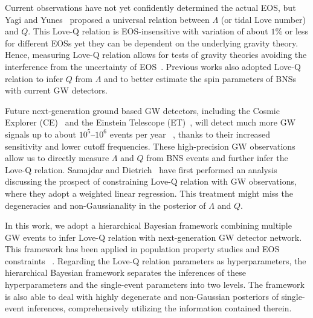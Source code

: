 \documentclass[a4paper,11pt]{article}
\begin{document}
Current observations have not yet confidently determined the actual EOS, but Yagi 
and Yunes~\cite{Yagi:2013bca,Yagi:2013awa} proposed a universal relation between 
$\Lambda$ (or tidal Love number) and $Q$. This Love-Q relation is EOS-insensitive 
with variation of about $1\%$ or less for different EOSs yet they can be dependent 
on the underlying gravity theory. Hence, measuring Love-Q relation allows for 
tests of gravity theories avoiding the interference from the uncertainty of 
EOS~\cite{Yagi:2013bca,Silva:2020acr,Shao:2022koz}. Previous works also adopted 
Love-Q relation to infer $Q$ from $\Lambda$ and to better estimate the spin 
parameters of BNSs~\cite{Yagi:2013bca,LIGOScientific:2018cki,
LIGOScientific:2018hze,LIGOScientific:2020aai} with current GW detectors. 

Future next-generation ground based GW detectors, including the Cosmic Explorer 
(CE)~\cite{Reitze:2019iox,Reitze:2019dyk} and the Einstein Telescope (ET)~\cite{Punturo:2010zz,Hild:2010id,Sathyaprakash:2012jk}, 
will detect much more GW signals up to about $10^5$--$10^6$ events per year
~\cite{LIGOScientific:2017zlf,Sathyaprakash:2019yqt,Kalogera:2021bya,Samajdar:2021egv}, 
thanks to their 
increased sensitivity and lower cutoff frequencies. These high-precision GW 
observations allow us to directly measure $\Lambda$ and $Q$ from BNS events and 
further infer the Love-Q relation. Samajdar and Dietrich~\cite{Samajdar:2020xrd} 
have first performed an analysis discussing the prospect of constraining Love-Q 
relation with GW observations, where they adopt a weighted linear regression. 
This treatment might miss the degeneracies and non-Gaussianality in the posterior of $\Lambda$ and $Q$. 

In this work, we adopt a hierarchical Bayesian framework combining multiple GW 
events to infer Love-Q relation with next-generation GW detector network. 
This framework has been applied in population property studies and EOS constraints
~\cite{Mandel:2009nx,Mandel:2009pc,Adams:2012qw,Lackey:2014fwa,Mandel:2018mve,Thrane_2019,KAGRA:2021duu,Wang:2024xon}. 
Regarding the Love-Q relation parameters as hyperparameters, the hierarchical 
Bayesian framework separates the inferences of these hyperparameters and the 
single-event parameters into two levels. The framework is also able to deal with 
highly degenerate and non-Gaussian posteriors of single-event inferences, comprehensively utilizing the information contained therein. 
\end{document}
